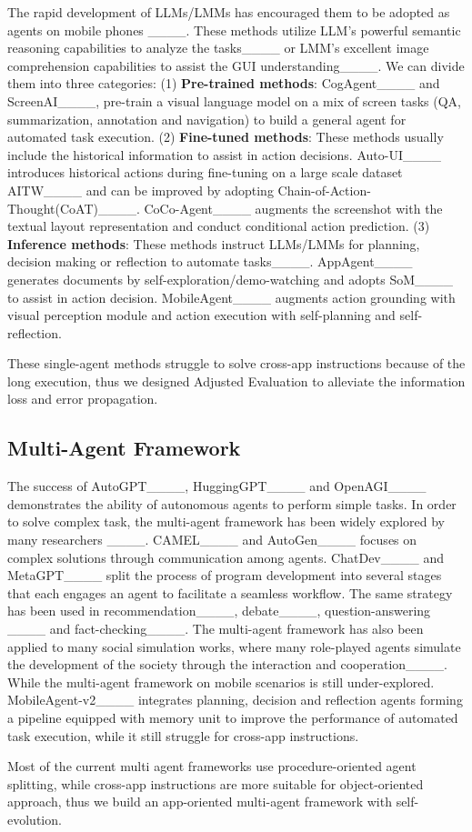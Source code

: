 The rapid development of LLMs/LMMs has encouraged them to be adopted as agents on mobile phones ____. These methods utilize LLM's powerful semantic reasoning capabilities to analyze the tasks____ or LMM's excellent image comprehension capabilities to assist the GUI understanding____. We can divide them into three categories:
(1) \textbf{Pre-trained methods}: CogAgent____ and ScreenAI____, pre-train a visual language model on a mix of screen tasks (QA, summarization, annotation and navigation) to build a general agent for automated task execution.
(2) \textbf{Fine-tuned methods}: These methods usually include the historical information to assist in action decisions. 
Auto-UI____ introduces historical actions during fine-tuning on a large scale dataset AITW____ and can be improved by adopting Chain-of-Action-Thought(CoAT)____. 
CoCo-Agent____ augments the screenshot with the textual layout representation and conduct conditional action prediction. 
(3) \textbf{Inference methods}: These methods instruct LLMs/LMMs for planning, decision making or reflection to automate tasks____.
AppAgent____ generates documents by self-exploration/demo-watching and adopts SoM____ to assist in action decision. 
MobileAgent____ augments action grounding with visual perception module and action execution with self-planning and self-reflection.

These single-agent methods struggle to solve cross-app instructions because of the long execution, thus we designed Adjusted Evaluation to alleviate the information loss and error propagation.

\subsection{Multi-Agent Framework}

The success of AutoGPT____, HuggingGPT____ and OpenAGI____ demonstrates the ability of autonomous agents to perform simple tasks.
In order to solve complex task, the multi-agent framework has been widely explored by many researchers ____. 
CAMEL____ and AutoGen____ focuses on complex solutions through communication among agents.
ChatDev____ and MetaGPT____ split the process of program development into several stages that each engages an agent to facilitate a seamless workflow. The same strategy has been used in recommendation____, debate____, question-answering ____ and fact-checking____. 
The multi-agent framework has also been applied to many social simulation works, where many role-played agents simulate the development of the society through the interaction and cooperation____.
While the multi-agent framework on mobile scenarios is still under-explored. MobileAgent-v2____ integrates planning, decision and reflection agents forming a pipeline equipped with memory unit to improve the performance of automated task execution, while it still struggle for cross-app instructions.

Most of the current multi agent frameworks use procedure-oriented agent splitting, while cross-app instructions are more suitable for object-oriented approach, thus we build an app-oriented multi-agent framework with self-evolution.